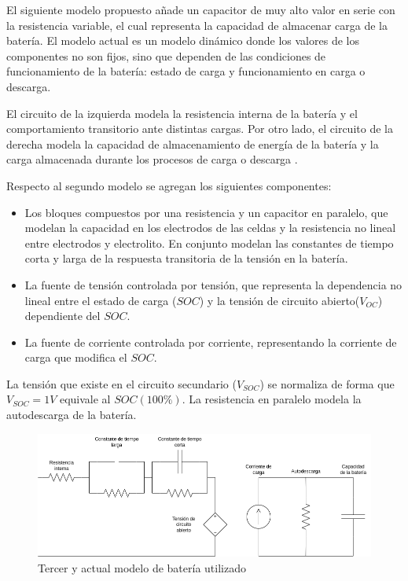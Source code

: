 El siguiente modelo propuesto añade un capacitor de muy alto valor en serie con la resistencia variable,
el cual representa la capacidad de almacenar carga de la batería.
El modelo actual es un modelo dinámico donde los valores de los componentes no son fijos,
sino que dependen de las condiciones de funcionamiento de la batería: estado de carga y funcionamiento en carga o descarga.

El circuito de la izquierda modela la resistencia interna de la batería y el comportamiento transitorio ante distintas cargas.
Por otro lado, el circuito de la derecha modela la capacidad de almacenamiento de energía de la batería y la carga almacenada durante los procesos de carga o descarga \cite{bateria}.

Respecto al segundo modelo se agregan los siguientes componentes:
\begin{itemize}
    \item Los bloques compuestos por una resistencia y un capacitor en paralelo, que modelan la capacidad en los electrodos de las celdas y
    la resistencia no lineal entre electrodos y electrolito.
    En conjunto modelan las constantes de tiempo corta y larga de la respuesta transitoria de la tensión en la batería\cite{bateria_espanol}.
    \item La fuente de tensión controlada por tensión, que representa la dependencia no lineal entre el estado de carga ($SOC$)
    y la tensión de circuito abierto($V_{OC}$) dependiente del $SOC$.
    \item La fuente de corriente controlada por corriente, representando la corriente de carga que modifica el $SOC$.
\end{itemize}
La tensión que existe en el circuito secundario ($V_{SOC}$) se normaliza de forma que $V_{SOC}=1V$ equivale al $SOC (100\%)$.
La resistencia en paralelo modela la autodescarga de la batería.

\begin{figure}
    \centering
    \includegraphics[width=\textwidth]{images/bateria_3.png}
    \caption{Tercer y actual modelo de batería utilizado}
    \label{fig:bateria_3}
\end{figure}

